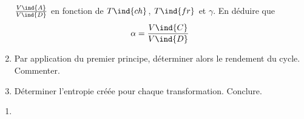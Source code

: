 \documentclass[../../main/main.tex]{subfiles}
\begin{document}
\begin{tcb*}[breakable]
\begin{enumerate}[label=\sqenumi]
		      $\frac{V\ind{A}}{V\ind{D}}$ en fonction de $T\ind{ch}$, $T\ind{fr}$ et
		      $\gamma$. En déduire que
		      \[
			      \alpha = \frac{V\ind{C}}{V\ind{D}}
		      \]
		      \vspace{-15pt}
		\item Par application du premier principe, déterminer alors le rendement du
		      cycle. Commenter.
		\item Déterminer l'entropie créée pour chaque transformation. Conclure.
	\end{enumerate}
	\tcblower
	\begin{enumerate}[label=\sqenumi]
		\item ~
		      \vspace{-30pt}
		      \smallbreak
		      \begin{isd}
\end{isd}
\end{enumerate}
\end{tcb*}
\end{document}
